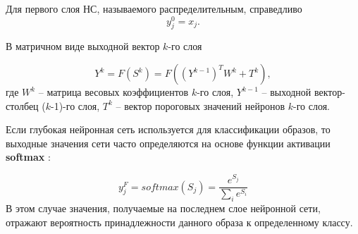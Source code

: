Для первого слоя НС, называемого распределительным, справедливо		
\begin{equation}
y_j^0=x_j.
\end{equation}

В матричном виде выходной вектор $k$-го слоя 

\begin{equation}
Y^k=F(S^k)=F((Y^{k-1})^TW^k+T^k),
\end{equation}
где $W^k$ -- матрица весовых коэффициентов $k$-го слоя, $Y^{k-1}$ -- выходной вектор-столбец ($k$-1)-го слоя, $T^k$ -- вектор пороговых значений нейронов $k$-го слоя.

Если глубокая нейронная сеть используется для классификации образов, то выходные значения сети часто определяются на основе функции активации \textbf{softmax} \cite{golovko2017}: 		

\begin{equation}
y_j^F=softmax(S_j)=\frac{e^{S_j}}{\sum_i e^{S_i}}
\end{equation}
В этом случае значения, получаемые на последнем слое нейронной сети, отражают вероятность принадлежности данного образа к определенному классу.


